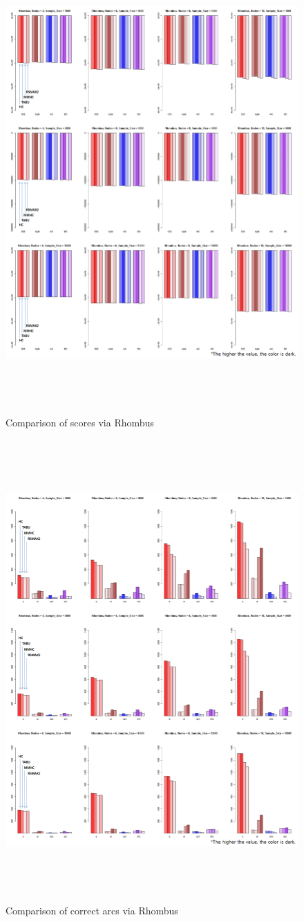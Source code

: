 	\begin{figure}[p]
	\centering
		\includegraphics[height=500pt]{images/06_Rhombus_Score}
		\caption{Comparison of scores via Rhombus}
	\end{figure}	

	\begin{figure}[p]
	\centering
		\includegraphics[height=500pt]{images/06_Rhombus_Arcs}
		\caption{Comparison of correct arcs via Rhombus}
	\end{figure}	
